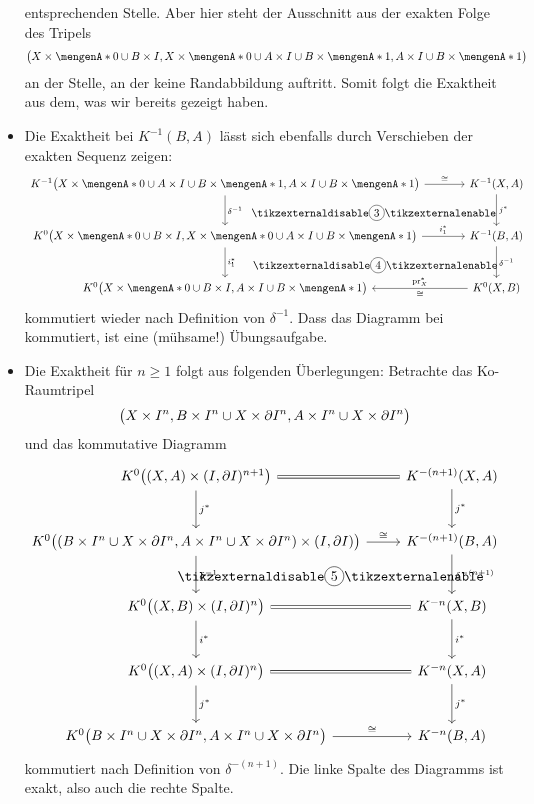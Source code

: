 \begin{beweis}
\begin{itemize}
	entsprechenden Stelle. Aber hier steht der Ausschnitt aus der exakten Folge des Tripels 
	\[
		\enbrace[\big]{X \times \set{0} \cup B \times I, X \times \set{0} \cup A \times I \cup B \times \set{1}, A \times I \cup B \times \set{1}} 
	\]
	an der Stelle, an der keine Randabbildung auftritt. Somit folgt die Exaktheit aus dem, was wir bereits gezeigt haben.
	\item Die Exaktheit bei $K ^{-1}(B,A)$ lässt sich ebenfalls durch Verschieben der exakten Sequenz zeigen:
	\[
		\begin{tikzcd}[column sep=large,row sep=large]
			K^{-1} \enbrace[\big]{X \times \set{0} \cup A \times I \cup B \times \set{1}, A \times I \cup B \times \set{1}} \rar["\cong"] \dar["\delta^{-1}"] 
			\drar[phantom,"\circled{\text{3}}"]
			&  K ^{-1}(X,A) \dar["j^*"] \\
			K^0 \enbrace[\big]{X \times \set{0} \cup B \times I, X \times \set{0} \cup A \times I \cup B \times \set{1}} \rar["i_1^*"] \dar["i_1^*"] 
			\drar[phantom,"\circled{\text{4}}"]
			& K ^{-1}(B,A) \dar["\delta^{-1}"]\\
			K^0 \enbrace[\big]{X \times \set{0} \cup B \times I, A \times I \cup B \times \set{1}} & K^0 (X,B) \lar["\cong","\pr_X^*"']  
		\end{tikzcd}
	\]
	 kommutiert wieder nach Definition von $\delta ^{-1}$. Dass das Diagramm bei  kommutiert, ist eine (mühsame!) Übungsaufgabe.
	\item Die Exaktheit für $n\ge 1$ folgt aus folgenden Überlegungen: Betrachte das Ko-Raumtripel
	\[
		\enbrace[\big]{X \times I^n, B \times I^n \cup X \times \partial I^n, A \times I^n \cup X \times \partial I^n} 
	\]
	und das kommutative Diagramm
	\[
		\begin{tikzcd}[row sep=large]
			K^0 \enbrace[\big]{(X,A) \times (I,\partial I)^{n+1}} \rar[equal] \dar["j^*"] & K^{-(n+1)}(X,A) \dar["j^*"] \\
			K^0 \enbrace[\big]{ \enbrace*{B \times I^n \cup X \times \partial I^n, A \times I^n \cup X \times \partial I^n} \times (I,\partial I)} 
			\dar["\delta^{-1}"] \rar["\cong"] \drar[phantom,"\circled{\text{5}}"] & K^{-(n+1)}(B,A) \dar["\delta^{-(n+1)}"] \\
			K^0 \enbrace[\big]{(X,B) \times (I,\partial I)^n} \rar[equal] \dar["i^*"] & K^{-n}(X,B) \dar["i^*"]\\
			K^0 \enbrace[\big]{ (X,A) \times (I,\partial I)^n} \rar[equal] \dar["j^*"] & K^{-n}(X,A) \dar["j^*"] \\
			K^0 \enbrace[\big]{B \times I^n \cup X \times \partial I^n, A \times I^n \cup X \times \partial I^n} \rar["\cong"] & K^{-n}(B,A)
		\end{tikzcd}
	\]
	 kommutiert nach Definition von $\delta^{-(n+1)}$. Die linke Spalte des Diagramms ist exakt, also auch die rechte Spalte. \qedhere {}
\end{itemize}
\end{beweis}
\newpage
